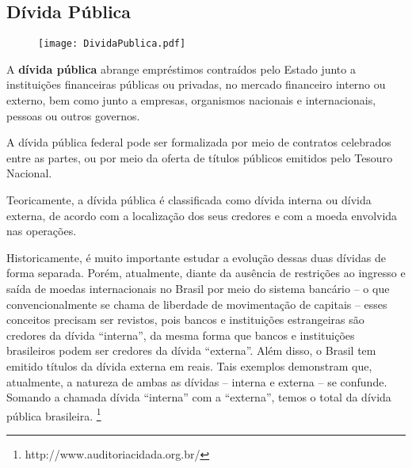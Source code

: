 \documentclass[../../relatorio.tex]{subfiles}
\begin{document}
\subsection{Dívida Pública}

\begin{figure}[ht]
  \begin{minipage}{0.70\textheight}
    \centering
      \texttt{[image: DividaPublica.pdf]}
  \end{minipage}
\end{figure}

A \textbf{dívida pública} abrange empréstimos contraídos pelo Estado junto a instituições financeiras públicas ou privadas, no mercado financeiro interno ou externo, bem como junto a empresas, organismos nacionais e internacionais, pessoas ou outros governos.

A dívida pública federal pode ser formalizada por meio de contratos celebrados entre as partes, ou por meio da oferta de títulos públicos emitidos pelo Tesouro Nacional.


Teoricamente, a dívida pública é classificada como dívida interna ou dívida externa, de acordo com a localização dos seus credores e com a moeda envolvida nas operações.

Historicamente, é muito importante estudar a evolução dessas duas dívidas de forma separada. Porém, atualmente, diante da ausência de restrições ao ingresso e saída de moedas internacionais no Brasil por meio do sistema bancário – o que convencionalmente se chama de liberdade de movimentação de capitais – esses conceitos precisam ser revistos, pois bancos e instituições estrangeiras são credores da dívida “interna”, da mesma forma que bancos e instituições brasileiros podem ser credores da dívida “externa”. Além disso, o Brasil tem emitido títulos da dívida externa em reais. Tais exemplos demonstram que, atualmente, a natureza de ambas as dívidas – interna e externa – se confunde. Somando a chamada dívida “interna” com a “externa”, temos o total da dívida pública brasileira. \footnote{http://www.auditoriacidada.org.br/}

\pagebreak
\end{document}
